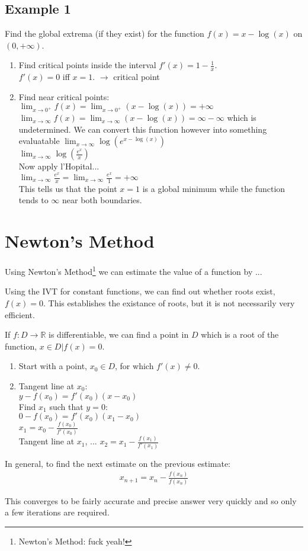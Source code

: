 \subsection{Example 1}
Find the global extrema (if they exist) for the function
$f(x) = x - \log(x)$ on $(0,+\infty)$.

\begin{enumerate}
  \item Find critical points inside the interval
  $f'(x) = 1 - \frac{1}{x}$. \\
  $f'(x) = 0$ iff $x=1$. $\to$ critical point \\
  \item Find near critical points: \\
  $\lim_{x \to 0^+} f(x) = \lim_{x \to 0^+} (x - \log(x)) = +\infty$ \\
  $\lim_{x \to \infty} f(x) = \lim_{x \to \infty} (x - \log(x)) = \infty - \infty$
  which is undetermined. We can convert this function however into something evaluatable
  $\lim_{x \to \infty} \log(e^{x - \log(x)})$ \\
  $\lim_{x \to \infty} \log(\frac{e^x}{x})$ \\
  Now apply l'Hopital... \\
  $\lim_{x \to \infty} \frac{e^x}{x} = \lim_{x \to \infty} \frac{e^x}{1} = +\infty$\\
  This tells us that the point $x=1$ is a global minimum while the function
  tends to $\infty$ near both boundaries.
\end{enumerate}

\section{Newton's Method}
Using Newton's Method\footnote{Newton's Method: fuck yeah!} we can estimate the
value of a function by ...

Using the IVT for constant functions, we can find out whether roots exist,
$f(x)=0$. This establishes the existance of roots, but it is not necessarily
very efficient.

If $f: D \to \mathbb{R}$ is differentiable, we can find a point in $D$ which is
a root of the function, $x \in D | f(x) = 0$.

\begin{enumerate}
  \item Start with a point, $x_0 \in D$, for which $f'(x) \neq 0$.
  \item Tangent line at $x_0$: \\
  $y - f(x_0) = f'(x_0)(x-x_0)$ \\
  Find $x_1$ such that $y=0$: \\
  $0-f(x_0) = f'(x_0)(x_1 - x_0)$ \\
  $x_1 = x_0 - \frac{f(x_0)}{f'(x_0)}$ \\
  Tangent line at $x_1$, ...
  $x_2 = x_1 - \frac{f(x_1)}{f'(x_1)}$ \\
\end{enumerate}
In general, to find the next estimate on the previous estimate:
\begin{align}
  x_{n+1} = x_n - \frac{f(x_n)}{f(x_n)}
\end{align}

This converges to be fairly accurate and precise answer very quickly and so only
a few iterations are required.
